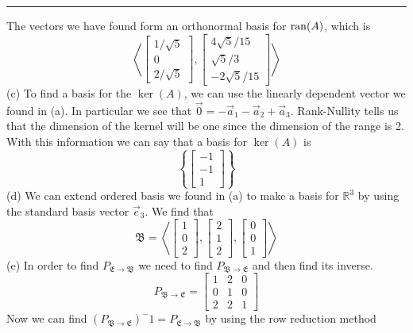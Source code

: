 \documentclass{report}
\begin{document}
\vspace{0.5em}
\hrule
\vspace{1em}
\noindent The vectors we have found form an orthonormal basis for $\operatorname{ran}(A)$, which is
$$
\left\langle\begin{bmatrix} 1/\sqrt{5} \\ 0 \\ 2/\sqrt{5} \end{bmatrix},\begin{bmatrix}4\sqrt{5}/15\\\sqrt{5}/3\\-2\sqrt{5}/15\end{bmatrix}\right\rangle
$$
(c) To find a basis for the $\ker(A)$, we can use the linearly dependent vector we found in (a). In particular we see that $\vec{0} = -\vec{a}_1 - \vec{a}_2 + \vec{a}_3$. Rank-Nullity tells us that the dimension of the kernel will be one since the dimension of the range is 2. With this information we can say that a basis for $\ker(A)$ is
$$
\left\{\begin{bmatrix}-1\\-1\\1\end{bmatrix}\right\}
$$
(d) We can extend ordered basis we found in (a) to make a basis for $\mathbb{R}^3$ by using the standard basis vector $\vec{e}_3$. We find that
$$
\mathfrak{B} = \left\langle\begin{bmatrix}1\\0\\2\end{bmatrix},\begin{bmatrix}2\\1\\2\end{bmatrix},\begin{bmatrix}0\\0\\1\end{bmatrix}\right\rangle
$$
(e) In order to find $P_{\mathfrak{E}\rightarrow\mathfrak{B}}$ we need to find $P_{\mathfrak{B}\rightarrow\mathfrak{E}}$ and then find its inverse.
$$
P_{\mathfrak{B}\rightarrow\mathfrak{E}} = \begin{bmatrix}1&2&0\\0&1&0\\2&2&1\end{bmatrix}
$$
Now we can find $(P_{\mathfrak{B}\rightarrow\mathfrak{E}})^-1=P_{\mathfrak{E}\rightarrow\mathfrak{B}}$ by using the row reduction method
\end{document}
